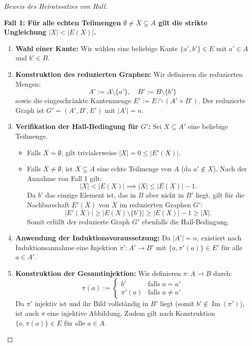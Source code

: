\begin{proof}[Beweis des Heiratssatzes von Hall]
\begin{math-stroke}
\textbf{Fall 1: Für alle echten Teilmengen $\emptyset \neq X \subsetneq A$ gilt die strikte Ungleichung $|X| < |E(X)|$.}
\begin{enumerate}[label=\textbf{\arabic*.}]
    \item \textbf{Wahl einer Kante:} Wir wählen eine beliebige Kante $\{a', b'\} \in E$ mit $a' \in A$ und $b' \in B$.
    \item \textbf{Konstruktion des reduzierten Graphen:} Wir definieren die reduzierten Mengen:
    \[
    A' := A \setminus \{a'\}, \quad B' := B \setminus \{b'\}
    \]
    sowie die eingeschränkte Kantenmenge $E' := E \cap (A' \times B')$. Der reduzierte Graph ist $G' = (A', B', E')$ mit $|A'| = n$.
    \item \textbf{Verifikation der Hall-Bedingung für $G'$:} Sei $X \subseteq A'$ eine beliebige Teilmenge.
    \begin{itemize}
        \item Falls $X = \emptyset$, gilt trivialerweise $|X| = 0 \le |E'(X)|$.
        \item Falls $X \neq \emptyset$, ist $X \subsetneq A$ eine echte Teilmenge von $A$ (da $a' \notin X$). Nach der Annahme von Fall 1 gilt:
        \[
        |X| < |E(X)| \implies |X| \le |E(X)| - 1.
        \]
        Da $b'$ das einzige Element ist, das in $B$ aber nicht in $B'$ liegt, gilt für die Nachbarschaft $E'(X)$ von $X$ im reduzierten Graphen $G'$:
        \[
        |E'(X)| \ge |E(X) \setminus \{b'\}| \ge |E(X)| - 1 \ge |X|.
        \]
        Somit erfüllt der reduzierte Graph $G'$ ebenfalls die Hall-Bedingung.
    \end{itemize}
    \item \textbf{Anwendung der Induktionsvoraussetzung:} Da $|A'| = n$, existiert nach Induktionsannahme eine Injektion $\pi' \colon A' \to B'$ mit $\{a, \pi'(a)\} \in E'$ für alle $a \in A'$.
    \item \textbf{Konstruktion der Gesamtinjektion:} Wir definieren $\pi \colon A \to B$ durch:
    \[
    \pi(a) := \begin{cases}
    b' & \text{falls } a = a' \\
    \pi'(a) & \text{falls } a \neq a'
    \end{cases}
    \]
    Da $\pi'$ injektiv ist und ihr Bild vollständig in $B'$ liegt (somit $b' \notin \operatorname{Im}(\pi')$), ist auch $\pi$ eine injektive Abbildung. Zudem gilt nach Konstruktion $\{a, \pi(a)\} \in E$ für alle $a \in A$.
\end{enumerate}
        

\end{math-stroke}
\end{proof}
